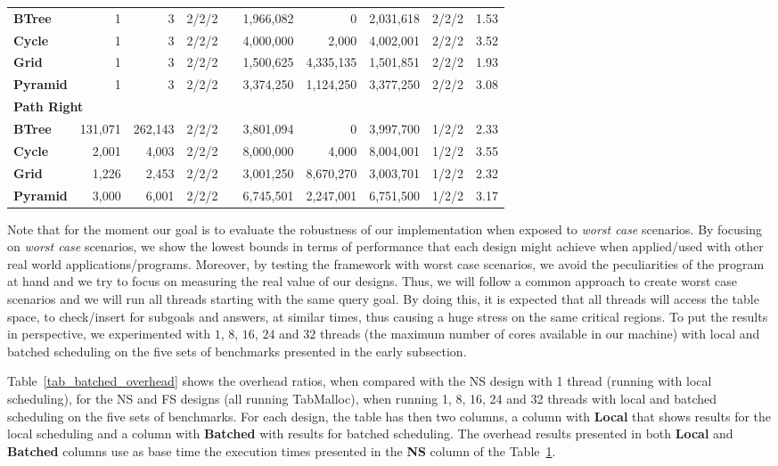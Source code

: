 \documentclass{llncs}
\begin{document}
\begin{table}[ht]
{\begin{tabular}{lrrccrrrcc}
\bf{BTree}    &       1 &       3 & 2/2/2 && 1,966,082 &         0 &
2,031,618 &    2/2/2 &   1.53 \\
\bf{Cycle}    &       1 &       3 & 2/2/2 && 4,000,000 &     2,000 &
4,002,001 &    2/2/2 &   3.52 \\
\bf{Grid}     &       1 &       3 & 2/2/2 && 1,500,625 & 4,335,135 &
1,501,851 &    2/2/2 &  1.93 \\
\bf{Pyramid}  &       1 &       3 & 2/2/2 && 3,374,250 & 1,124,250 &
3,377,250 &    2/2/2 &   3.08 \\
\hline
\multicolumn{10}{l}{\bf Path Right} \\
\bf{BTree}    & 131,071 & 262,143 & 2/2/2 && 3,801,094 &         0 &
3,997,700 &    1/2/2 &  2.33 \\
\bf{Cycle}    &   2,001 &   4,003 & 2/2/2 && 8,000,000 &     4,000 &
8,004,001 &    1/2/2 &  3.55 \\
\bf{Grid}     &   1,226 &   2,453 & 2/2/2 && 3,001,250 & 8,670,270 &
3,003,701 &    1/2/2 &  2.32 \\
\bf{Pyramid}  &   3,000 &   6,001 & 2/2/2 && 6,745,501 & 2,247,001 &
6,751,500 &    1/2/2 &  3.17 \\
\hline\hline
\end{tabular}}
\label{tab_benchs}
\end{table}

Note that for the moment our goal is to evaluate the robustness of our
implementation when exposed to \emph{worst case} scenarios. By
focusing on \emph{worst case} scenarios, we show the lowest bounds in
terms of performance that each design might achieve when applied/used
with other real world applications/programs. Moreover, by testing the
framework with worst case scenarios, we avoid the peculiarities of the
program at hand and we try to focus on measuring the real value of our
designs. Thus, we will follow a common approach to create worst case
scenarios and we will run all threads starting with the same query
goal. By doing this, it is expected that all threads will access the
table space, to check/insert for subgoals and answers, at similar
times, thus causing a huge stress on the same critical regions. To put
the results in perspective, we experimented with $1$, $8$, $16$, $24$
and $32$ threads (the maximum number of cores available in our
machine) with local and batched scheduling on the five sets of
benchmarks presented in the early subsection.

Table~\ref{tab_batched_overhead} shows the overhead ratios, when
compared with the NS design with 1 thread (running with local
scheduling), for the NS and FS designs (all running TabMalloc), when
running 1, 8, 16, 24 and 32 threads with local and batched scheduling
on the five sets of benchmarks. For each design, the table has then
two columns, a column with {\bf Local} that shows results for the
local scheduling and a column with {\bf Batched} with results for
batched scheduling. The overhead results presented in both {\bf Local}
and {\bf Batched} columns use as base time the execution times
presented in the {\bf NS} column of the Table~\ref{tab_benchs}.
\end{document}
